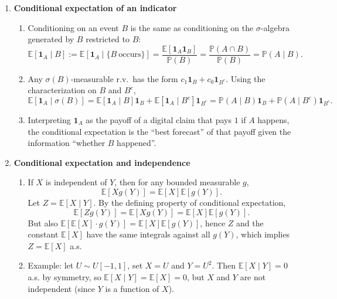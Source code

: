 \documentclass[11pt]{article}
\begin{document}
\begin{enumerate}
\bigskip

\item \textbf{Conditional expectation of an indicator}

\begin{enumerate}
\item Conditioning on an event $B$ is the same as conditioning on the $\sigma$-algebra generated by $B$ restricted to $B$:
\[
\mathbb{E}[\mathbf{1}_A\mid B]
:=\mathbb{E}[\mathbf{1}_A\mid \{B\ \text{occurs}\}]
=\frac{\mathbb{E}[\mathbf{1}_A\mathbf{1}_B]}{\mathbb{P}(B)}
=\frac{\mathbb{P}(A\cap B)}{\mathbb{P}(B)}
=\mathbb{P}(A\mid B).
\]

\item Any $\sigma(B)$-measurable r.v.\ has the form $c_1\mathbf{1}_B+c_0\mathbf{1}_{B^c}$.
Using the characterization on $B$ and $B^c$,
\[
\mathbb{E}[\mathbf{1}_A\mid \sigma(B)]
=\mathbb{E}[\mathbf{1}_A\mid B]\mathbf{1}_B+\mathbb{E}[\mathbf{1}_A\mid B^c]\mathbf{1}_{B^c}
=\mathbb{P}(A\mid B)\mathbf{1}_B+\mathbb{P}(A\mid B^c)\mathbf{1}_{B^c}.
\]

\item Interpreting $\mathbf{1}_A$ as the payoff of a digital claim that pays $1$ if $A$ happens, the conditional
expectation is the ``best forecast'' of that payoff given the information ``whether $B$ happened''.
\end{enumerate}

\bigskip

\item \textbf{Conditional expectation and independence}

\begin{enumerate}
\item If $X$ is independent of $Y$, then for any bounded measurable $g$,
\[
\mathbb{E}[Xg(Y)]=\mathbb{E}[X]\mathbb{E}[g(Y)].
\]
Let $Z=\mathbb{E}[X\mid Y]$. By the defining property of conditional expectation,
\[
\mathbb{E}[Zg(Y)]=\mathbb{E}[Xg(Y)]=\mathbb{E}[X]\mathbb{E}[g(Y)].
\]
But also $\mathbb{E}[\mathbb{E}[X]\cdot g(Y)]=\mathbb{E}[X]\mathbb{E}[g(Y)]$, hence $Z$ and the constant $\mathbb{E}[X]$
have the same integrals against all $g(Y)$, which implies $Z=\mathbb{E}[X]$ a.s.

\item Example: let $U\sim U[-1,1]$, set $X=U$ and $Y=U^2$. Then $\mathbb{E}[X\mid Y]=0$ a.s. by symmetry,
so $\mathbb{E}[X\mid Y]=\mathbb{E}[X]=0$, but $X$ and $Y$ are not independent (since $Y$ is a function of $X$).


\end{enumerate}
\end{enumerate}
\end{document}
